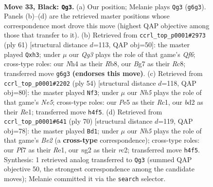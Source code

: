 \documentclass[11pt]{article}
\begin{document}
\clearpage

\begin{figure}[p]\centering
\begin{subfigure}{0.46\textwidth}\centering
\resizebox{\linewidth}{!}{%
\newchessgame
\chessboard[
  setfen={nr4k1/Q4pb1/R5qp/4p3/4P2n/1r3P2/1P1B1RN1/1N4K1 b - - 0 33},
  showmover=false,
  pgfstyle=straightmove, color=movearrow, markmove={g6-g3}
]}
\caption{}
\end{subfigure}\hfill
\begin{subfigure}{0.46\textwidth}\centering
\resizebox{\linewidth}{!}{%
\newchessgame
\chessboard[
  setfen={1rr4k/5pp1/p2R3p/2nQ4/P3P3/2P2q1P/1P6/1KRB4 b - - 2 31},
  showmover=false,
  pgfstyle=straightmove, color=movearrow, markmove={f3-h3}
]}
\caption{}
\end{subfigure}
\\[4pt]
\begin{subfigure}{0.46\textwidth}\centering
\resizebox{\linewidth}{!}{%
\newchessgame
\chessboard[
  setfen={br2r3/5Qbk/p5pp/4N1qn/4P3/pB5P/1B3PP1/2R1R1K1 w - - 1 28},
  showmover=false,
  pgfstyle=straightmove, color=movearrow, markmove={e5-f3}
]}
\caption{}
\end{subfigure}\hfill
\begin{subfigure}{0.46\textwidth}\centering
\resizebox{\linewidth}{!}{%
\newchessgame
\chessboard[
  setfen={7k/6p1/5rbp/2pP4/3nNq1P/4RP2/2r1B1P1/Q3R1K1 w - - 5 36},
  showmover=false,
  pgfstyle=straightmove, color=movearrow, markmove={e2-d1}
]}
\caption{}
\end{subfigure}
\caption{\textbf{Move 33, Black: \texttt{Qg3}.} (a) Our position; Melanie plays \texttt{Qg3} (\texttt{g6g3}). Panels (b)--(d) are the retrieved master positions whose correspondence most drove this move (highest QAP objective among those that transfer to it). (b) Retrieved from \texttt{ccrl\_top\_p0001\#2973} (ply 61) [structural distance $d$=113, QAP obj=50]: the master played \texttt{Qxh3}; under $\mu$ our \emph{Qg3} plays the role of that game's \emph{Qf6}; cross-type roles: our \emph{N}h4 as their \emph{R}b8, our \emph{B}g7 as their \emph{R}c8; transferred move \texttt{g6g3} \textbf{(endorses this move)}. (c) Retrieved from \texttt{ccrl\_top\_p0001\#2202} (ply 54) [structural distance $d$=118, QAP obj=80]: the master played \texttt{Nf3}; under $\mu$ our \emph{Nh5} plays the role of that game's \emph{Ne5}; cross-type roles: our \emph{P}e5 as their \emph{R}c1, our \emph{b}d2 as their \emph{R}e1; transferred move \texttt{h4f5}. (d) Retrieved from \texttt{ccrl\_top\_p0001\#641} (ply 70) [structural distance $d$=119, QAP obj=78]: the master played \texttt{Bd1}; under $\mu$ our \emph{Nh5} plays the role of that game's \emph{Be2} (a \textbf{cross-type} correspondence); cross-type roles: our \emph{P}f7 as their \emph{R}e1, our \emph{n}g2 as their \emph{r}c2; transferred move \texttt{h4f5}. Synthesis: 1 retrieved analog transferred to \texttt{Qg3} (summed QAP objective 50, the strongest correspondence among the candidate moves); Melanie committed it via the \texttt{search} selector.}
\label{fig:thought-m65}
\end{figure}
\end{document}
